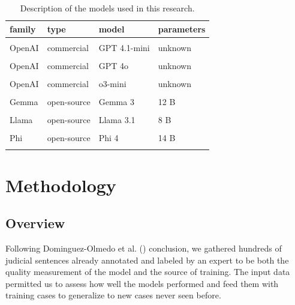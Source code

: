 \documentclass[
  12pt,
]{article}
\begin{document}
\begin{longtable}[t]{llll}

\toprule
family & type & model & parameters\\
\midrule
\cellcolor{gray!10}{OpenAI} & \cellcolor{gray!10}{commercial} & \cellcolor{gray!10}{GPT 4.1} & \cellcolor{gray!10}{unknown}\\
OpenAI & commercial & GPT 4.1-mini & unknown\\
\cellcolor{gray!10}{OpenAI} & \cellcolor{gray!10}{commercial} & \cellcolor{gray!10}{GPT 4.1-nano} & \cellcolor{gray!10}{unknown}\\
OpenAI & commercial & GPT 4o & unknown\\
\cellcolor{gray!10}{OpenAI} & \cellcolor{gray!10}{commercial} & \cellcolor{gray!10}{GPT 4o-mini} & \cellcolor{gray!10}{unknown}\\
\addlinespace
OpenAI & commercial & o3-mini & unknown\\
\cellcolor{gray!10}{Gemma} & \cellcolor{gray!10}{open-source} & \cellcolor{gray!10}{Gemma 3} & \cellcolor{gray!10}{27 B}\\
Gemma & open-source & Gemma 3 & 12 B\\
\cellcolor{gray!10}{Gemma} & \cellcolor{gray!10}{open-source} & \cellcolor{gray!10}{Gemma 3} & \cellcolor{gray!10}{1 B}\\
Llama & open-source & Llama 3.1 & 8 B\\
\addlinespace
\cellcolor{gray!10}{Llama} & \cellcolor{gray!10}{open-source} & \cellcolor{gray!10}{Llama 3.2} & \cellcolor{gray!10}{3 B}\\
Phi & open-source & Phi 4 & 14 B\\
\bottomrule


\caption{\label{tbl-models-description}Description of the models used in
this research.}

\tabularnewline
\end{longtable}

\section{Methodology}\label{sec-methods}

\subsection{Overview}\label{overview}

Following Dominguez-Olmedo et al.
() conclusion, we
gathered hundreds of judicial sentences already annotated and labeled by
an expert to be both the quality measurement of the model and the source
of training. The input data permitted us to assess how well the models
performed and feed them with training cases to generalize to new cases
never seen before.
\end{document}
